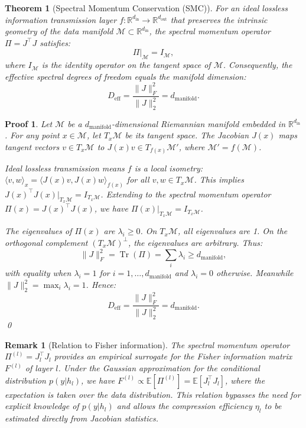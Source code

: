 \documentclass[11pt, a4paper]{article}
\newtheorem{theo}{Theorem}[section]
\theoremstyle{plain}
\newtheorem*{remark}{Remark}
\newtheorem*{pf}{Proof}
\def\R{{\mathbb R}}
\DeclareMathOperator{\Tr}{Tr}
\def\sM{{\mathcal M}}
\begin{document}
\begin{theo}[Spectral Momentum Conservation (SMC)]\label{theo:smc}
For an ideal lossless information transmission layer $f: \R^{d_{\text{in}}} \to \R^{d_{\text{out}}}$ that preserves the intrinsic geometry of the data manifold $\sM \subset \R^{d_{\text{in}}}$, the spectral momentum operator $\Pi = J^\top J$ satisfies:
\begin{equation}
\Pi|_{\sM} = I_{\sM},
\end{equation}
where $I_{\sM}$ is the identity operator on the tangent space of $\sM$. Consequently, the effective spectral degrees of freedom equals the manifold dimension:
\begin{equation}
D_{\text{eff}} = \frac{\|J\|_F^2}{\|J\|_2^2} = d_{\text{manifold}}.
\end{equation}
\end{theo}

\begin{pf}
Let $\sM$ be a $d_{\text{manifold}}$-dimensional Riemannian manifold embedded in $\R^{d_{\text{in}}}$. For any point $x \in \sM$, let $T_x\sM$ be its tangent space. The Jacobian $J(x)$ maps tangent vectors $v \in T_x\sM$ to $J(x)v \in T_{f(x)}\sM'$, where $\sM' = f(\sM)$.

Ideal lossless transmission means $f$ is a local isometry: $\langle v, w\rangle_x = \langle J(x)v, J(x)w\rangle_{f(x)}$ for all $v,w \in T_x\sM$. This implies $J(x)^\top J(x)|_{T_x\sM} = I_{T_x\sM}$. Extending to the spectral momentum operator $\Pi(x) = J(x)^\top J(x)$, we have $\Pi(x)|_{T_x\sM} = I_{T_x\sM}$.

The eigenvalues of $\Pi(x)$ are $\lambda_i \geq 0$. On $T_x\sM$, all eigenvalues are 1. On the orthogonal complement $(T_x\sM)^\perp$, the eigenvalues are arbitrary. Thus:
\begin{equation}
\|J\|_F^2 = \Tr(\Pi) = \sum_i \lambda_i \geq d_{\text{manifold}},
\end{equation}
with equality when $\lambda_i = 1$ for $i=1,\ldots,d_{\text{manifold}}$ and $\lambda_i = 0$ otherwise. Meanwhile $\|J\|_2^2 = \max_i \lambda_i = 1$. Hence:
\begin{equation}
D_{\text{eff}} = \frac{\|J\|_F^2}{\|J\|_2^2} = d_{\text{manifold}}.
\end{equation}
\qed
\end{pf}

\begin{remark}[Relation to Fisher information]
The spectral momentum operator $\Pi^{(l)} = J_l^\top J_l$ provides an empirical surrogate for the Fisher information matrix $F^{(l)}$ of layer $l$. Under the Gaussian approximation for the conditional distribution $p(y|h_l)$, we have $F^{(l)} \propto \mathbb{E}[\Pi^{(l)}] = \mathbb{E}[J_l^\top J_l]$, where the expectation is taken over the data distribution. This relation bypasses the need for explicit knowledge of $p(y|h_l)$ and allows the compression efficiency $\eta_l$ to be estimated directly from Jacobian statistics.
\end{remark}
\end{document}
